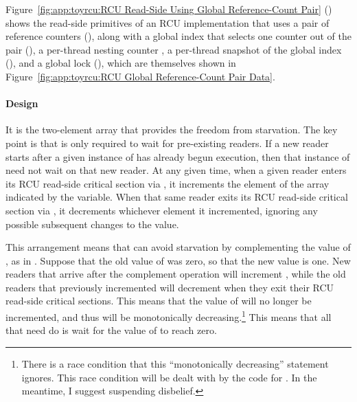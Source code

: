 Figure~\ref{fig:app:toyrcu:RCU Read-Side Using Global Reference-Count Pair}
()
shows the read-side primitives of an RCU implementation that uses a pair
of reference counters (),
along with a global index that
selects one counter out of the pair (),
a per-thread nesting counter ,
a per-thread snapshot of the global index (),
and a global lock (),
which are themselves shown in
Figure~\ref{fig:app:toyrcu:RCU Global Reference-Count Pair Data}.

\paragraph{Design}

It is the two-element  array that provides the freedom
from starvation.
The key point is that  is only required to wait
for pre-existing readers.
If a new reader starts after a given instance of 
has already begun execution, then that instance of 
need not wait on that new reader.
At any given time, when a given reader enters its RCU read-side critical
section via ,
it increments the element of the  array indicated by
the  variable.
When that same reader exits its RCU read-side critical section via
, it decrements whichever element it incremented,
ignoring any possible subsequent changes to the  value.

This arrangement means that  can avoid starvation
by complementing the value of , as in .
Suppose that the old value of  was zero, so that the new
value is one.
New readers that arrive after the complement operation will increment
, while the old readers that previously incremented
 will decrement  when they exit their
RCU read-side critical sections.
This means that the value of  will no longer be incremented,
and thus will be monotonically decreasing.\footnote{
	There is a race condition that this ``monotonically decreasing''
	statement ignores.
	This race condition will be dealt with by the code for
	.
	In the meantime, I suggest suspending disbelief.}
This means that all that  need do is wait for the
value of  to reach zero.

